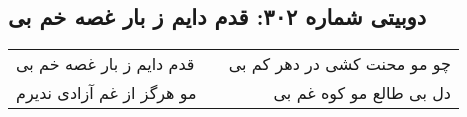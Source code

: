 \begin{center}
\section*{دوبیتی شماره ۳۰۲: قدم دایم ز بار غصه خم بی}
\label{sec:302}
\begin{longtable}{l p{0.5cm} r}
قدم دایم ز بار غصه خم بی
&&
چو مو محنت کشی در دهر کم بی
\\
مو هرگز از غم آزادی ندیرم
&&
دل بی طالع مو کوه غم بی
\\
\end{longtable}
\end{center}
